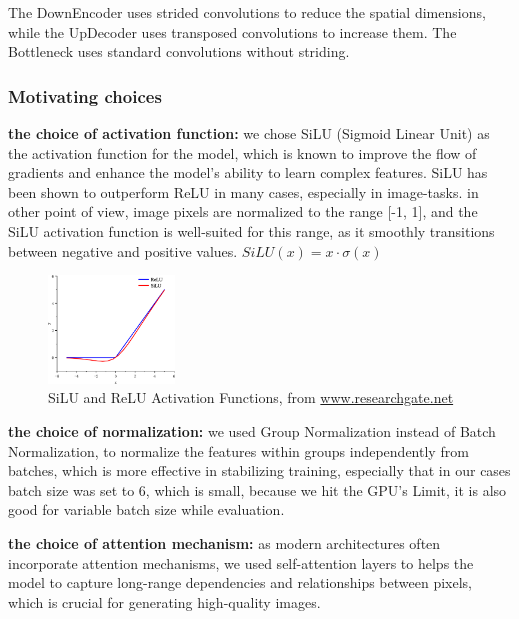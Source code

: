 \documentclass[twocolumn,superscriptaddress,aps]{revtex4-1}
\begin{document}
The DownEncoder uses strided convolutions to reduce the spatial dimensions, while the UpDecoder uses transposed convolutions to increase them. The Bottleneck uses standard convolutions without striding.


\subsubsection{Motivating choices}

\textbf{the choice of activation function:} we chose SiLU (Sigmoid Linear Unit) as the activation function for the model, which is known to improve the flow of gradients and enhance the model's ability to learn complex features. SiLU has been shown to outperform ReLU in many cases, especially in image-tasks.
in other point of view, image pixels are normalized to the range [-1, 1], and the SiLU activation function is well-suited for this range, as it smoothly transitions between negative and positive values.
$SiLU(x) = x \cdot \sigma(x)$

\begin{figure}[ht]
    \centering
    \includegraphics[width=0.3\textwidth]{figures/ReLU-and-SiLU-activation-function-curve.png}
    \caption{SiLU and ReLU Activation Functions, from \small{\href{https://www.researchgate.net/figure/ReLU-and-SiLU-activation-function-curve_fig1_363232692}{www.researchgate.net}} }
    \label{fig:silu}
\end{figure}


\textbf{the choice of normalization:} we used Group Normalization instead of Batch Normalization, to normalize the features within groups independently from batches, which is more effective in stabilizing training, especially that in our cases batch size was set to 6, which is small, because we hit the GPU's Limit, it is also good for variable batch size while evaluation.

\textbf{the choice of attention mechanism:} as modern architectures often incorporate attention mechanisms, we used self-attention layers to helps the model to capture long-range dependencies and relationships between pixels, which is crucial for generating high-quality images.
\end{document}
